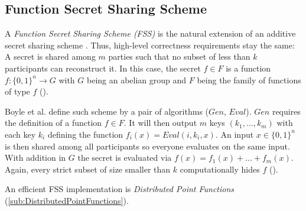 \subsection{Function Secret Sharing Scheme}
\label{sub:FunctionSecretSharingScheme}
A \textit{Function Secret Sharing Scheme (FSS)} is the natural extension of an additive secret sharing scheme \cite{boyle2016function}.
Thus, high-level correctness requirements stay the same: A secret is shared among $m$ parties such that no subset of less than $k$ participants can reconstruct it.
In this case, the secret $f\in F$ is a function $f:\{0,1\}^n\rightarrow G$ with $G$ being an abelian group and $F$ being the family of functions of type $f$ (\cite{boyle2015function}).

Boyle et al. \cite{boyle2015function} define such scheme by a pair of algorithms ($Gen$, $Eval$).
$Gen$ requires the definition of a function $f\in F$.
It will then output $m$ keys $(k_1,...,k_m)$ with each key $k_i$ defining the function $f_i(x)=Eval(i,k_i,x)$.
An input $x\in \{0,1\}^n$ is then shared among all participants so everyone evaluates on the same input.
With addition in $G$ the secret is evaluated via $f(x)=f_1(x)+...+f_m(x)$.
Again, every strict subset of size smaller than $k$ computationally hides $f$ (\cite{boyle2016function}).

An efficient FSS implementation is \textit{Distributed Point Functions} (\ref{sub:DistributedPointFunctions}).